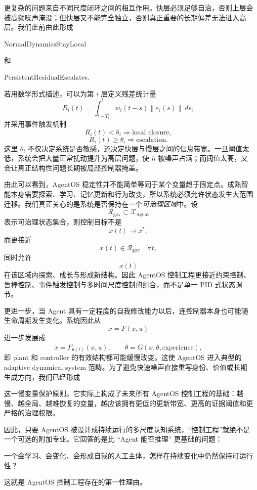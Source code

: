 更复杂的问题来自不同尺度闭环之间的相互作用。快层必须足够自治，否则上层会被高频噪声淹没；但快层又不能完全独立，否则真正重要的长期偏差无法进入高层。我们此前由此形成
\begin{statementbox}
NormalDynamicsStayLocal
\end{statementbox}
和
\begin{statementbox}
PersistentResidualEscalates.
\end{statementbox}
若用数学形式描述，可以为第 $i$ 层定义残差统计量
\[
R_i(t)
=
\int_{t-T_i}^{t}
w_i(t-s)
\left\|
\varepsilon_i(s)
\right\|
\,ds,
\]
并采用事件触发机制
\[
R_i(t)<\theta_i
\Rightarrow
\text{local closure},
\]
\[
R_i(t)\geq\theta_i
\Rightarrow
\text{escalation}.
\]
这里 $\theta_i$ 不仅决定系统是否敏感，还决定快层与慢层之间的信息带宽。一旦阈值太低，系统会把大量正常扰动提升为高层问题，使 $h$ 被噪声占满；而阈值太高，又会让真正结构性问题长期被局部控制器掩盖。

由此可以看到，AgentOS 稳定性并不能简单等同于某个变量趋于固定点。成熟智能本身需要探索、学习、记忆更新和行为改变，所以系统必须允许状态发生大范围迁移。我们真正关心的是系统是否保持在一个\emph{可治理区域}中。设
\[
\mathcal R_{\mathrm{gov}}
\subset
\mathcal X_{\mathrm{Agent}}
\]
表示可治理状态集合，则控制目标不是
\[
x(t)\rightarrow x^{*},
\]
而更接近
\[
\boxed{
x(t)\in\mathcal R_{\mathrm{gov}}
\quad
\forall t,
}
\]
同时允许
\[
x(t)
\]
在该区域内探索、成长与形成新结构。因此 AgentOS 控制工程更接近约束控制、鲁棒控制、事件触发控制与多时间尺度控制的组合，而不是单一 PID 式状态调节。

更进一步，当 Agent 具有一定程度的自我修改能力以后，连控制器本身也可能随生命周期发生变化。系统因此从
\[
\dot{x}=F(x,u)
\]
进一步发展成
\[
\dot{x}
=
F_{\theta(t)}
(x,u),
\qquad
\dot{\theta}
=
G(x,\theta,\text{experience}),
\]
即 plant 和 controller 的有效结构都可能缓慢改变。这使 AgentOS 进入典型的 adaptive dynamical system 范畴。为了避免快速噪声直接重写身份、价值或长期生成方向，我们已经形成
\begin{statementbox}
\centering
{}
\end{statementbox}
这一慢变量保护原则。它实际上构成了未来所有 AgentOS 控制工程的基础：越慢、越全局、越难恢复的变量，越应该拥有更低的更新带宽、更高的证据阈值和更严格的治理权限。

因此，只要 AgentOS 被设计成持续运行的多尺度认知系统，“控制工程”就绝不是一个可选的附加专业。它回答的是比 ``Agent 能否推理'' 更基础的问题：

\begin{statementbox}
一个会学习、会变化、会形成自我的人工主体，怎样在持续变化中仍然保持可运行性？
\end{statementbox}
这就是 AgentOS 控制工程存在的第一性理由。

